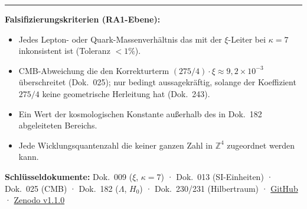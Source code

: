 \vspace{0.3em}\hrule\vspace{0.4em}

\noindent\textbf{Falsifizierungskriterien (RA1-Ebene):}
\begin{itemize}[nosep,itemsep=1pt]
  \item Jedes Lepton- oder Quark-Massenverhältnis das mit der $\xi$-Leiter bei $\kappa=7$ inkonsistent ist (Toleranz $<1\%$).
  \item CMB-Abweichung die den Korrekturterm $(275/4)\cdot\xi \approx 9{,}2\times10^{-3}$ überschreitet (Dok.~025); nur bedingt aussagekräftig, solange der Koeffizient $275/4$ keine geometrische Herleitung hat (Dok.~243).
  \item Ein Wert der kosmologischen Konstante außerhalb des in Dok.~182 abgeleiteten Bereichs.
  \item Jede Wicklungsquantenzahl die keiner ganzen Zahl in $\mathbb{Z}^4$ zugeordnet werden kann.
\end{itemize}

\vspace{0.3em}
\noindent\textbf{Schlüsseldokumente:}
Dok.~009 ($\xi$, $\kappa=7$) ·
Dok.~013 (SI-Einheiten) ·
Dok.~025 (CMB) ·
Dok.~182 ($\Lambda$, $H_0$) ·
Dok.~230/231 (Hilbertraum) ·
\href{https://github.com/jpascher/T0-Time-Mass-Duality}{GitHub} ·
\href{https://doi.org/10.5281/zenodo.20117635}{Zenodo v1.1.0}

